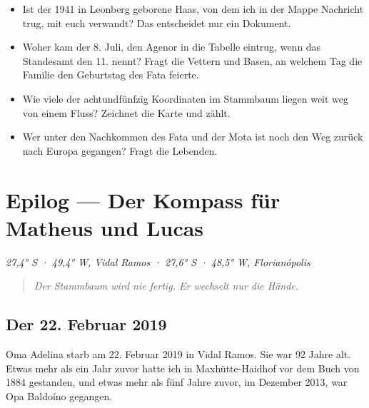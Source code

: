 \documentclass[
  ngerman,
  11pt,
  openany]{book}
\providecommand{\tightlist}{%
  \setlength{\itemsep}{0pt}\setlength{\parskip}{0pt}}
\begin{document}
\begin{itemize}
\tightlist
\item
  Ist der 1941 in Leonberg geborene Haas, von dem ich in der Mappe
  Nachricht trug, mit euch verwandt? Das entscheidet nur ein Dokument.
\item
  Woher kam der 8. Juli, den Agenor in die Tabelle eintrug, wenn das
  Standesamt den 11. nennt? Fragt die Vettern und Basen, an welchem Tag
  die Familie den Geburtstag des Fata feierte.
\item
  Wie viele der achtundfünfzig Koordinaten im Stammbaum liegen weit weg
  von einem Fluss? Zeichnet die Karte und zählt.
\item
  Wer unter den Nachkommen des Fata und der Mota ist noch den Weg zurück
  nach Europa gegangen? Fragt die Lebenden.
\end{itemize}

\chapter*{Epilog --- Der Kompass für Matheus und Lucas}\label{epilogo}

\emph{27,4° S · 49,4° W, Vidal Ramos · 27,6° S · 48,5° W, Florianópolis}

\begin{quote}
\emph{Der Stammbaum wird nie fertig. Er wechselt nur die Hände.}
\end{quote}

\section{Der 22. Februar 2019}\label{der-22.-februar-2019}

Oma Adelina starb am 22. Februar 2019 in Vidal Ramos. Sie war 92 Jahre
alt. Etwas mehr als ein Jahr zuvor hatte ich in Maxhütte-Haidhof vor dem
Buch von 1884 gestanden, und etwas mehr als fünf Jahre zuvor, im
Dezember 2013, war Opa Baldoíno gegangen.
\end{document}
